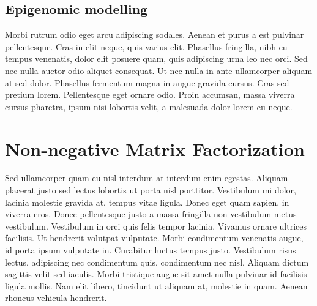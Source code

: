 
\subsection{Epigenomic modelling}
Morbi rutrum odio eget arcu adipiscing sodales. Aenean et purus a est pulvinar pellentesque. Cras in elit neque, quis varius elit. Phasellus fringilla, nibh eu tempus venenatis, dolor elit posuere quam, quis adipiscing urna leo nec orci. Sed nec nulla auctor odio aliquet consequat. Ut nec nulla in ante ullamcorper aliquam at sed dolor. Phasellus fermentum magna in augue gravida cursus. Cras sed pretium lorem. Pellentesque eget ornare odio. Proin accumsan, massa viverra cursus pharetra, ipsum nisi lobortis velit, a malesuada dolor lorem eu neque.


\section{Non-negative Matrix Factorization}

Sed ullamcorper quam eu nisl interdum at interdum enim egestas. Aliquam placerat justo sed lectus lobortis ut porta nisl porttitor. Vestibulum mi dolor, lacinia molestie gravida at, tempus vitae ligula. Donec eget quam sapien, in viverra eros. Donec pellentesque justo a massa fringilla non vestibulum metus vestibulum. Vestibulum in orci quis felis tempor lacinia. Vivamus ornare ultrices facilisis. Ut hendrerit volutpat vulputate. Morbi condimentum venenatis augue, id porta ipsum vulputate in. Curabitur luctus tempus justo. Vestibulum risus lectus, adipiscing nec condimentum quis, condimentum nec nisl. Aliquam dictum sagittis velit sed iaculis. Morbi tristique augue sit amet nulla pulvinar id facilisis ligula mollis. Nam elit libero, tincidunt ut aliquam at, molestie in quam. Aenean rhoncus vehicula hendrerit.
